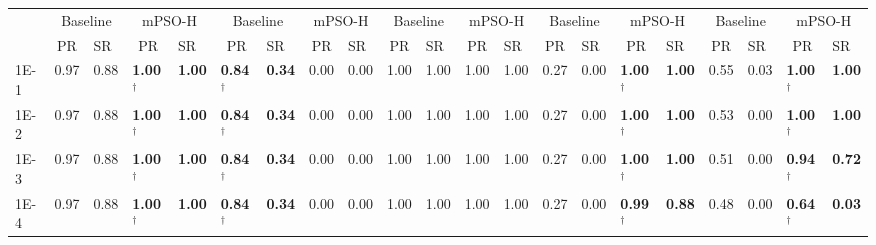 \begin{table*}[h]
{\begin{tabular}{|p{4.8mm}|p{4.4mm}|p{4.4mm}|p{4.4mm}|p{4.4mm}|p{4.4mm}|p{4.4mm}|p{4.4mm}|p{4.4mm}|p{4.4mm}|p{4.4mm}|p{4.4mm}|p{4.4mm}|p{4.4mm}|p{4.4mm}|p{4.4mm}|p{4.4mm}|p{4.4mm}|p{4.4mm}|p{4.4mm}|p{4.4mm}|}
    \cline{2-21}
    & \multicolumn{2}{c|}{Baseline} & \multicolumn{2}{c|}{mPSO-H} & \multicolumn{2}{c|}{Baseline} & \multicolumn{2}{c|}{mPSO-H} & \multicolumn{2}{c|}{Baseline} & \multicolumn{2}{c|}{mPSO-H} & \multicolumn{2}{c|}{Baseline} & \multicolumn{2}{c|}{mPSO-H} & \multicolumn{2}{c|}{Baseline} & \multicolumn{2}{c|}{mPSO-H} \\

    \cline{2-21}
     & \multicolumn{1}{c|}{PR} & SR & \multicolumn{1}{c|}{PR} & SR & \multicolumn{1}{c|}{PR} & SR & \multicolumn{1}{c|}{PR} & SR & \multicolumn{1}{c|}{PR} & SR & \multicolumn{1}{c|}{PR} & SR & \multicolumn{1}{c|}{PR} & SR & \multicolumn{1}{c|}{PR} & SR & \multicolumn{1}{c|}{PR} & SR & \multicolumn{1}{c|}{PR} & SR \\
    \hline
    1E-1 & 0.97 & 0.88 & \textcolor{customblue}{\textbf{1.00$^\dagger$}} & \textcolor{customblue}{\textbf{1.00}} & \textcolor{customred}{\textbf{0.84$^\dagger$}} & \textcolor{customred}{\textbf{0.34}} & 0.00 & 0.00 & 1.00 & 1.00 & 1.00 & 1.00 & 0.27 & 0.00 & \textcolor{customblue}{\textbf{1.00$^\dagger$}} & \textcolor{customblue}{\textbf{1.00}} & 0.55 & 0.03 & \textcolor{customblue}{\textbf{1.00$^\dagger$}} & \textcolor{customblue}{\textbf{1.00}} \\
    1E-2 & 0.97 & 0.88 & \textcolor{customblue}{\textbf{1.00$^\dagger$}} & \textcolor{customblue}{\textbf{1.00}} & \textcolor{customred}{\textbf{0.84$^\dagger$}} & \textcolor{customred}{\textbf{0.34}} & 0.00 & 0.00 & 1.00 & 1.00 & 1.00 & 1.00 & 0.27 & 0.00 & \textcolor{customblue}{\textbf{1.00$^\dagger$}} & \textcolor{customblue}{\textbf{1.00}} & 0.53 & 0.00 & \textcolor{customblue}{\textbf{1.00$^\dagger$}} & \textcolor{customblue}{\textbf{1.00}} \\
    1E-3 & 0.97 & 0.88 & \textcolor{customblue}{\textbf{1.00$^\dagger$}} & \textcolor{customblue}{\textbf{1.00}} & \textcolor{customred}{\textbf{0.84$^\dagger$}} & \textcolor{customred}{\textbf{0.34}} & 0.00 & 0.00 & 1.00 & 1.00 & 1.00 & 1.00 & 0.27 & 0.00 & \textcolor{customblue}{\textbf{1.00$^\dagger$}} & \textcolor{customblue}{\textbf{1.00}} & 0.51 & 0.00 & \textcolor{customblue}{\textbf{0.94$^\dagger$}} & \textcolor{customblue}{\textbf{0.72}} \\
    1E-4 & 0.97 & 0.88 & \textcolor{customblue}{\textbf{1.00$^\dagger$}} & \textcolor{customblue}{\textbf{1.00}} & \textcolor{customred}{\textbf{0.84$^\dagger$}} & \textcolor{customred}{\textbf{0.34}} & 0.00 & 0.00 & 1.00 & 1.00 & 1.00 & 1.00 & 0.27 & 0.00 & \textcolor{customblue}{\textbf{0.99$^\dagger$}} & \textcolor{customblue}{\textbf{0.88}} & 0.48 & 0.00 & \textcolor{customblue}{\textbf{0.64$^\dagger$}} & \textcolor{customblue}{\textbf{0.03}} \\

\end{tabular}}
\end{table*}
